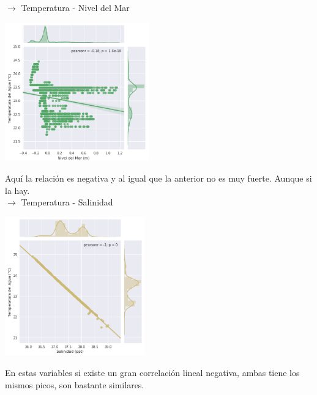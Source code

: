 \documentclass[12pt]{article}
\begin{document}
$\rightarrow$ Temperatura - Nivel del Mar
\begin{center}
	\includegraphics[height=6cm]{gc2_1.png}
\end{center}
Aquí la relación es negativa y al igual que la anterior no es muy fuerte. Aunque si la hay.\\
\newpage
$\rightarrow$ Temperatura - Salinidad
\begin{center}
	\includegraphics[height=6cm]{gc3.png}
\end{center}
En estas variables si existe un gran correlación lineal negativa, ambas tiene los mismos picos, son bastante similares.
\end{document}
